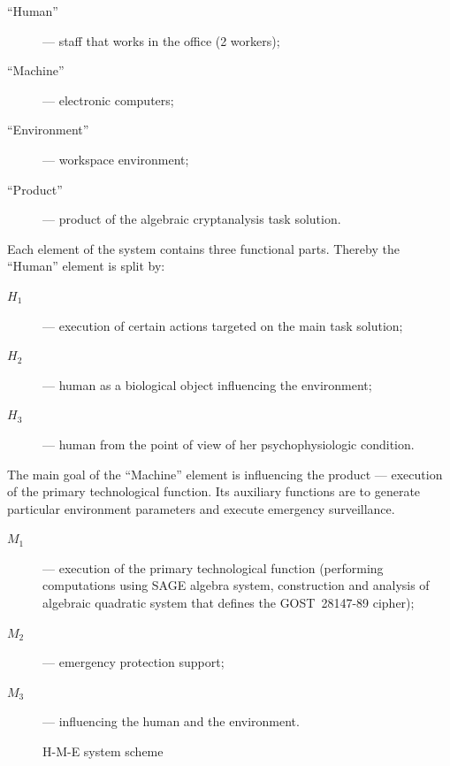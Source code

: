 \begin{description}
    \item[``Human''] --- staff that works in the office (2 workers);
    \item[``Machine''] --- electronic computers;
    \item[``Environment''] --- workspace environment;
    \item[``Product''] --- product of the algebraic cryptanalysis task solution.
\end{description}
Each element of the system contains three functional parts. Thereby the
``Human'' element is split by:
\begin{description}
    \item[$H_1$] --- execution of certain actions targeted on the main task solution;
    \item[$H_2$] --- human as a biological object influencing the environment;
    \item[$H_3$] --- human from the point of view of her psychophysiologic condition.
\end{description}
The main goal of the ``Machine'' element is influencing the product ---
execution of the primary technological function. Its auxiliary functions are to
generate particular environment parameters and execute emergency surveillance.
\begin{description}
    \item[$M_1$] --- execution of the primary technological function
        (performing computations using SAGE algebra system, construction and
        analysis of algebraic quadratic system that defines the GOST~28147-89
        cipher);
    \item[$M_2$] --- emergency protection support;
    \item[$M_3$] --- influencing the human and the environment.
\end{description}

\begin{figure}[htbp]
	\centering
    
	\caption{H-M-E system scheme}
	\label{fig:hme-graph}
\end{figure}

